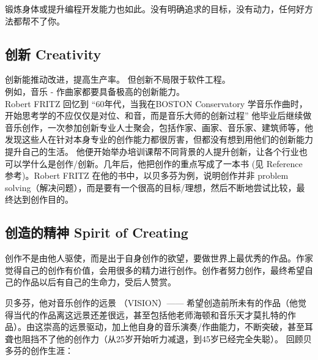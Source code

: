 锻炼身体或提升编程开发能力也如此。没有明确追求的目标，没有动力，任何好方法都帮不了你。

\hypertarget{ux521bux65b0-creativity}{%
\subsection{创新 Creativity}\label{ux521bux65b0-creativity}}

创新能推动改进，提高生产率。 但创新不局限于软件工程。\\
例如，音乐 - 作曲家都要具备极高的创新能力。\\
Robert FRITZ 回忆到 ``60年代，当我在BOSTON Conservatory
学音乐作曲时，开始思考学的不应仅仅是对位、和音，而是音乐大师的创新过程''
他毕业后继续做音乐创作，一次参加创新专业人士聚会，包括作家、画家、音乐家、建筑师等，他发现这些人在针对本身专业的创作能力都很厉害，但都没有想到用他们的创新能力提升自己的生活。
他便开始举办培训课帮不同背景的人提升创新，让各个行业也可以学什么是创作/创新。几年后，他把创作的重点写成了一本书
(见 Reference 参考)。Robert FRITZ 在他的书中，以贝多芬为例，说明创作并非
problem
solving（解决问题），而是要有一个很高的目标/理想，然后不断地尝试比较，最终达到创作目的。

\hypertarget{ux521bux9020ux7684ux7cbeux795e-spirit-of-creating}{%
\subsection{创造的精神 Spirit of
Creating}\label{ux521bux9020ux7684ux7cbeux795e-spirit-of-creating}}

创作不是由他人驱使，而是出于自身创作的欲望，要做世界上最优秀的作品。作家觉得自己的创作有价值，会用很多的精力进行创作。创作者努力创作，最终希望自己的作品以后有自己的生命力，受后人赞赏。

贝多芬，他对音乐创作的远景 （VISION）------
希望创造前所未有的作品（他觉得当代的作品离这远景还差很远，甚至包括他老师海顿和音乐天才莫扎特的作品）。由这崇高的远景驱动，加上他自身的音乐演奏/作曲能力，不断突破，甚至耳聋也阻挡不了他的创作力（从25岁开始听力减退，到45岁已经完全失聪）。
回顾贝多芬的创作生涯：\\



